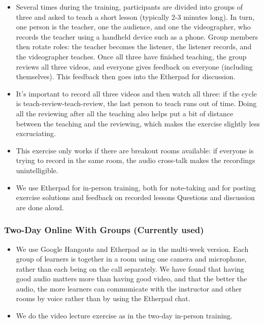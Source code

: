\begin{itemize}
\item
  Several times during the training, participants are divided into
  groups of three and asked to teach a short lesson (typically 2-3
  minutes long). In turn, one person is the teacher, one the audience,
  and one the videographer, who records the teacher using a handheld
  device such as a phone. Group members then rotate roles: the teacher
  becomes the listener, the listener records, and the videographer
  teaches. Once all three have finished teaching, the group reviews all
  three videos, and everyone gives feedback on everyone (including
  themselves). This feedback then goes into the Etherpad for discussion.
\item
  It's important to record all three videos and then watch all three: if
  the cycle is teach-review-teach-review, the last person to teach runs
  out of time. Doing all the reviewing after all the teaching also helps
  put a bit of distance between the teaching and the reviewing, which
  makes the exercise slightly less excruciating.
\item
  This exercise only works if there are breakout rooms available: if
  everyone is trying to record in the same room, the audio cross-talk
  makes the recordings unintelligible.
\item
  We use Etherpad for in-person training, both for note-taking and for
  posting exercise solutions and feedback on recorded lessons Questions
  and discussion are done aloud.
\end{itemize}

\subsubsection{Two-Day Online With Groups (Currently
used)}\label{two-day-online-with-groups-currently-used}

\begin{itemize}
\item
  We use Google Hangouts and Etherpad as in the multi-week version. Each
  group of learners is together in a room using one camera and
  microphone, rather than each being on the call separately. We have
  found that having good audio matters more than having good video, and
  that the better the audio, the more learners can communicate with the
  instructor and other rooms by voice rather than by using the Etherpad
  chat.
\item
  We do the video lecture exercise as in the two-day in-person training.
\end{itemize}

